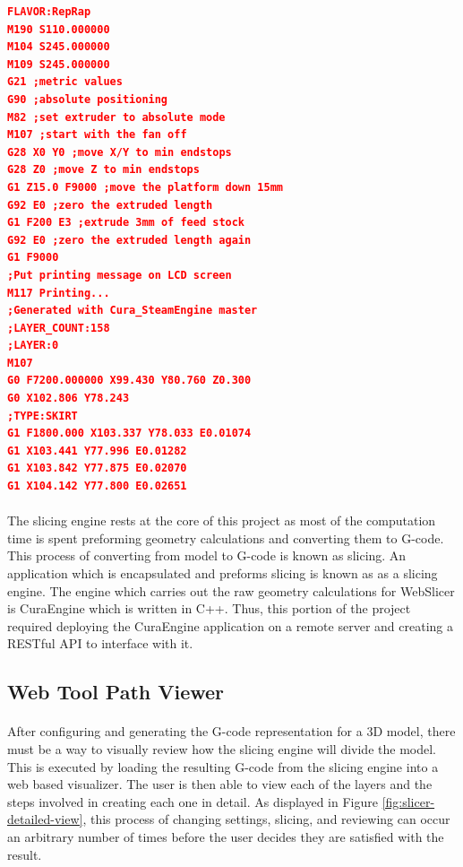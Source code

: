 \begin{lstlisting}[language=json, style=thesiscode , label={lst:gcode}, caption=A sample of G-code that results from slicing using CuraEngine.]
FLAVOR:RepRap
M190 S110.000000
M104 S245.000000
M109 S245.000000
G21 ;metric values
G90 ;absolute positioning
M82 ;set extruder to absolute mode
M107 ;start with the fan off
G28 X0 Y0 ;move X/Y to min endstops
G28 Z0 ;move Z to min endstops
G1 Z15.0 F9000 ;move the platform down 15mm
G92 E0 ;zero the extruded length
G1 F200 E3 ;extrude 3mm of feed stock
G92 E0 ;zero the extruded length again
G1 F9000
;Put printing message on LCD screen
M117 Printing...
;Generated with Cura_SteamEngine master
;LAYER_COUNT:158
;LAYER:0
M107
G0 F7200.000000 X99.430 Y80.760 Z0.300
G0 X102.806 Y78.243
;TYPE:SKIRT
G1 F1800.000 X103.337 Y78.033 E0.01074
G1 X103.441 Y77.996 E0.01282
G1 X103.842 Y77.875 E0.02070
G1 X104.142 Y77.800 E0.02651
\end{lstlisting}

\paragraph{}
The slicing engine rests at the core of this project as most of the computation time is spent preforming geometry calculations and converting them to G-code.
This process of converting from model to G-code is known as slicing.
An application which is encapsulated and preforms slicing is known as as a slicing engine.
The engine which carries out the raw geometry calculations for WebSlicer is CuraEngine which is written in C++.
Thus, this portion of the project required deploying the CuraEngine application on a remote server and creating a RESTful API to interface with it.

\subsection{Web Tool Path Viewer}
\paragraph{}
After configuring and generating the G-code representation for a 3D model, there must be a way to visually review how the slicing engine will divide the model.
This is executed by loading the resulting G-code from the slicing engine into a web based visualizer.
The user is then able to view each of the layers and the steps involved in creating each one in detail.
As displayed in Figure \ref{fig:slicer-detailed-view}, this process of changing settings, slicing, and reviewing can occur an arbitrary number of times before the user decides they are satisfied with the result.

